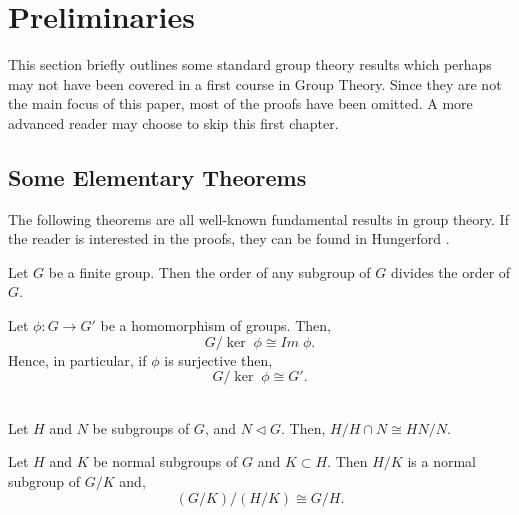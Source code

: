 \chapter{Preliminaries}\label{Ch3_Preliminaries}

This section briefly outlines some standard group theory results which perhaps may not have been covered in a first course in Group Theory. 
Since they are not the main focus of this paper, most of the proofs have been omitted. A more
advanced reader may choose to skip this first chapter.

\section{Some Elementary Theorems}

The following theorems are all well-known fundamental results in group theory. 
If the reader is interested in the proofs, they can be found in Hungerford \cite{hungerford}.

\begin{theorem}
     Let $G$ be a finite group. Then the order of any subgroup of $G$ divides the order of $G$. \\
\end{theorem} 

\begin{theorem}
     Let $\phi  :G \rightarrow G'$ be a homomorphism of groups. Then, $$G/\ker \; \phi \cong Im \; \phi.$$ Hence, in particular, if $\phi$ is surjective then, $$G/\ker \; \phi \cong G'.$$ \\
\end{theorem} 

\vspace{-10mm}

\begin{theorem}
    Let $H$ and $N$ be subgroups of $G$, and $N \vartriangleleft G$. Then, $H/H \cap N \cong HN/N.$ \\
\end{theorem} 

\vspace{-10mm}

\begin{theorem}
    Let $H$ and $K$ be normal subgroups of $G$ and $K \subset H$. Then $H/K$ is a normal subgroup of $G/K$ and, $$(G/K)/(H/K) \cong G/H.$$ \\
\end{theorem} 

